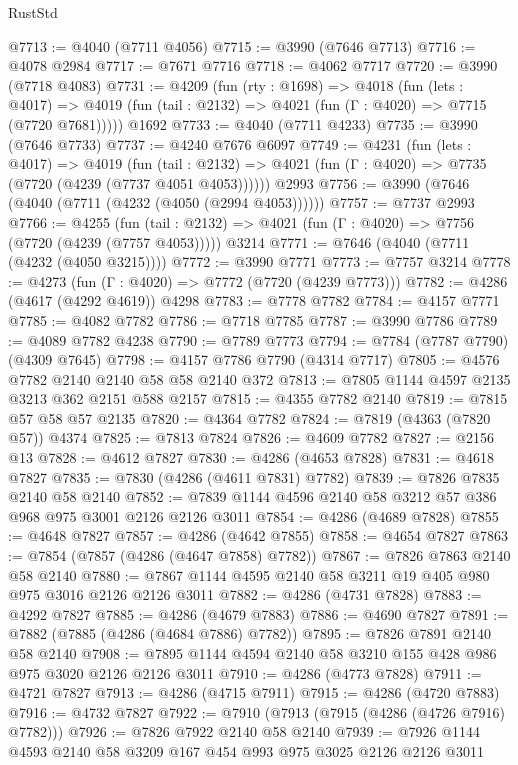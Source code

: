 \begin{lexlean}{RustStd}
\begin{coremodule}
{\begin{coremodule}
{{{{{{{{{{{{{{{{@7713 := @4040 (@7711 @4056)
@7715 := @3990 (@7646 @7713)
@7716 := @4078 @2984
@7717 := @7671 @7716
@7718 := @4062 @7717
@7720 := @3990 (@7718 @4083)
@7731 := @4209
    (fun (rty : @1698) =>
    @4018
      (fun (lets : @4017) =>
      @4019 (fun (tail : @2132) => @4021 (fun (Γ : @4020) => @7715 (@7720 @7681)))))
    @1692
@7733 := @4040 (@7711 @4233)
@7735 := @3990 (@7646 @7733)
@7737 := @4240 @7676 @6097
@7749 := @4231
    (fun (lets : @4017) =>
    @4019
      (fun (tail : @2132) => @4021 (fun (Γ : @4020) => @7735 (@7720 (@4239 (@7737 @4051 @4053))))))
    @2993
@7756 := @3990 (@7646 (@4040 (@7711 (@4232 (@4050 (@2994 @4053))))))
@7757 := @7737 @2993
@7766 := @4255
    (fun (tail : @2132) => @4021 (fun (Γ : @4020) => @7756 (@7720 (@4239 (@7757 @4053)))))
    @3214
@7771 := @7646 (@4040 (@7711 (@4232 (@4050 @3215))))
@7772 := @3990 @7771
@7773 := @7757 @3214
@7778 := @4273 (fun (Γ : @4020) => @7772 (@7720 (@4239 @7773)))
@7782 := @4286 (@4617 (@4292 @4619)) @4298
@7783 := @7778 @7782
@7784 := @4157 @7771
@7785 := @4082 @7782
@7786 := @7718 @7785
@7787 := @3990 @7786
@7789 := @4089 @7782 @4238
@7790 := @7789 @7773
@7794 := @7784 (@7787 @7790) (@4309 @7645)
@7798 := @4157 @7786 @7790 (@4314 @7717)
@7805 := @4576 @7782 @2140 @2140 @58 @58 @2140 @372
@7813 := @7805 @1144 @4597 @2135 @3213 @362 @2151 @588 @2157
@7815 := @4355 @7782 @2140
@7819 := @7815 @57 @58 @57 @2135
@7820 := @4364 @7782
@7824 := @7819 (@4363 (@7820 @57)) @4374
@7825 := @7813 @7824
@7826 := @4609 @7782
@7827 := @2156 @13
@7828 := @4612 @7827
@7830 := @4286 (@4653 @7828)
@7831 := @4618 @7827
@7835 := @7830 (@4286 (@4611 @7831) @7782)
@7839 := @7826 @7835 @2140 @58 @2140
@7852 := @7839 @1144 @4596 @2140 @58 @3212 @57 @386 @968 @975 @3001 @2126 @2126 @3011
@7854 := @4286 (@4689 @7828)
@7855 := @4648 @7827
@7857 := @4286 (@4642 @7855)
@7858 := @4654 @7827
@7863 := @7854 (@7857 (@4286 (@4647 @7858) @7782))
@7867 := @7826 @7863 @2140 @58 @2140
@7880 := @7867 @1144 @4595 @2140 @58 @3211 @19 @405 @980 @975 @3016 @2126 @2126 @3011
@7882 := @4286 (@4731 @7828)
@7883 := @4292 @7827
@7885 := @4286 (@4679 @7883)
@7886 := @4690 @7827
@7891 := @7882 (@7885 (@4286 (@4684 @7886) @7782))
@7895 := @7826 @7891 @2140 @58 @2140
@7908 := @7895 @1144 @4594 @2140 @58 @3210 @155 @428 @986 @975 @3020 @2126 @2126 @3011
@7910 := @4286 (@4773 @7828)
@7911 := @4721 @7827
@7913 := @4286 (@4715 @7911)
@7915 := @4286 (@4720 @7883)
@7916 := @4732 @7827
@7922 := @7910 (@7913 (@7915 (@4286 (@4726 @7916) @7782)))
@7926 := @7826 @7922 @2140 @58 @2140
@7939 := @7926 @1144 @4593 @2140 @58 @3209 @167 @454 @993 @975 @3025 @2126 @2126 @3011
}}}}}}}}}}}}}}}}
\end{coremodule}}
\end{coremodule}
\end{lexlean}
